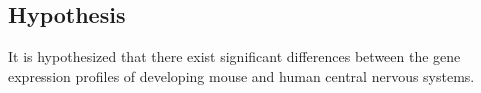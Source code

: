 \subsection{Hypothesis}

It is hypothesized that there exist significant differences between the gene expression profiles of developing mouse and human central nervous systems.